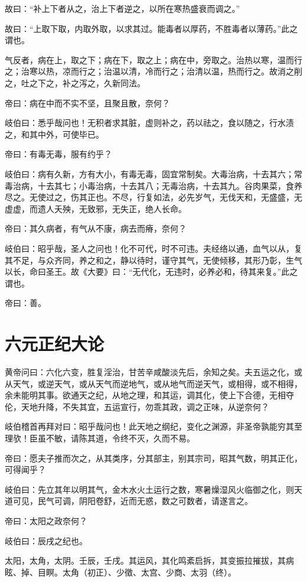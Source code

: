 \documentclass{article}%
\begin{document}
故曰：“补上下者从之，治上下者逆之，以所在寒热盛衰而调之。”

故曰：“上取下取，内取外取，以求其过。能毒者以厚药，不胜毒者以薄药。”此之谓也。

气反者，病在上，取之下；病在下，取之上；病在中，旁取之。治热以寒，温而行之；治寒以热，凉而行之；治温以清，冷而行之；治清以温，热而行之。故消之削之，吐之下之，补之泻之，久新同法。

帝曰：病在中而不实不坚，且聚且散，奈何？

岐伯曰：悉乎哉问也！无积者求其脏，虚则补之，药以祛之，食以随之，行水渍之，和其中外，可使毕已。

帝曰：有毒无毒，服有约乎？

岐伯曰：病有久新，方有大小，有毒无毒，固宜常制矣。大毒治病，十去其六；常毒治病，十去其七；小毒治病，十去其八；无毒治病，十去其九。谷肉果菜，食养尽之。无使过之，伤其正也。不尽，行复如法，必先岁气，无伐天和，无盛盛，无虚虚，而遗人夭殃，无致邪，无失正，绝人长命。

帝曰：其久病者，有气从不康，病去而瘠，奈何？

岐伯曰：昭乎哉，圣人之问也！化不可代，时不可违。夫经络以通，血气以从，复其不足，与众齐同，养之和之，静以待时，谨守其气，无使倾移，其形乃彰，生气以长，命曰圣王。故《大要》曰：“无代化，无违时，必养必和，待其来复。”此之谓也。

帝曰：善。
\section{六元正纪大论}
黄帝问曰：六化六变，胜复淫治，甘苦辛咸酸淡先后，余知之矣。夫五运之化，或从天气，或逆天气，或从天气而逆地气，或从地气而逆天气，或相得，或不相得，余未能明其事。欲通天之纪，从地之理，和其运，调其化，使上下合德，无相夺伦，天地升降，不失其宜，五运宣行，勿乖其政，调之正味，从逆奈何？

岐伯稽首再拜对曰：昭乎哉问也！此天地之纲纪，变化之渊源，非圣帝孰能穷其至理欤！臣虽不敏，请陈其道，令终不灭，久而不易。

帝曰：愿夫子推而次之，从其类序，分其部主，别其宗司，昭其气数，明其正化，可得闻乎？

岐伯曰：先立其年以明其气，金木水火土运行之数，寒暑燥湿风火临御之化，则天道可见，民气可调，阴阳卷舒，近而无惑，数之可数者，请遂言之。

帝曰：太阳之政奈何？

岐伯曰：辰戌之纪也。

太阳，太角，太阴。壬辰，壬戌。其运风，其化鸣紊启拆，其变振拉摧拔，其病眩、掉、目瞑。太角（初正）、少徵、太宫、少商、太羽（终）。
\end{document}
